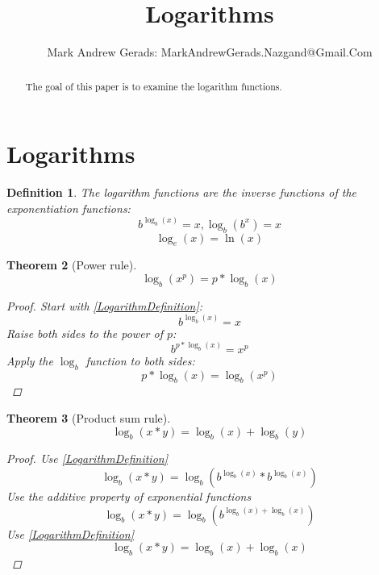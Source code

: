 \documentclass[]{article}
\author{Mark Andrew Gerads: MarkAndrewGerads.Nazgand@Gmail.Com}
\title{Logarithms}
\newcommand{\pqty}[1]{{\left(#1\right)}}
\newtheorem{theorem}{Theorem}[section]
\newtheorem{definition}[theorem]{Definition}
\numberwithin{equation}{section}
\begin{document}
	
	\maketitle
	
	\begin{abstract}
		The goal of this paper is to examine the logarithm functions.
	\end{abstract}
	
	\section{Logarithms}
	\begin{definition}
		The logarithm functions are the inverse functions of the exponentiation functions:
		\begin{equation}
			\label{LogarithmDefinition}
			b^{\log_b\pqty{x}}=x
			,
			\log_b\pqty{b^x}=x
		\end{equation}
		\begin{equation}
		\log_e\pqty{x}=\ln\pqty{x}
		\end{equation}
	\end{definition}

	\begin{theorem}[Power rule]
		\begin{equation}
		\log_b\pqty{x^p}=p*\log_b\pqty{x}
		\end{equation}
		\begin{proof}
			Start with \eqref{LogarithmDefinition}:
			\begin{equation}
			b^{\log_b\pqty{x}}=x
			\end{equation}
			Raise both sides to the power of \(p\):
			\begin{equation}
			b^{p*\log_b\pqty{x}}=x^p
			\end{equation}
			Apply the \(\log_b\) function to both sides:
			\begin{equation}
			p*\log_b\pqty{x}=\log_b\pqty{x^p}
			\end{equation}
		\end{proof}
	\end{theorem}

	\begin{theorem}[Product sum rule]
		\begin{equation}
		\log_b\pqty{x*y}=\log_b\pqty{x}+\log_b\pqty{y}
		\end{equation}
		\begin{proof}
			Use \eqref{LogarithmDefinition}
			\begin{equation}
			\log_b\pqty{x*y}=
			\log_b\pqty{b^{\log_b\pqty{x}}*b^{\log_b\pqty{x}}}
			\end{equation}
			Use the additive property of exponential functions
			\begin{equation}
			\log_b\pqty{x*y}=
			\log_b\pqty{b^{\log_b\pqty{x}+\log_b\pqty{x}}}
			\end{equation}
			Use \eqref{LogarithmDefinition}
			\begin{equation}
			\log_b\pqty{x*y}=
			\log_b\pqty{x}+\log_b\pqty{x}
			\end{equation}
		\end{proof}
	\end{theorem}
\end{document}
